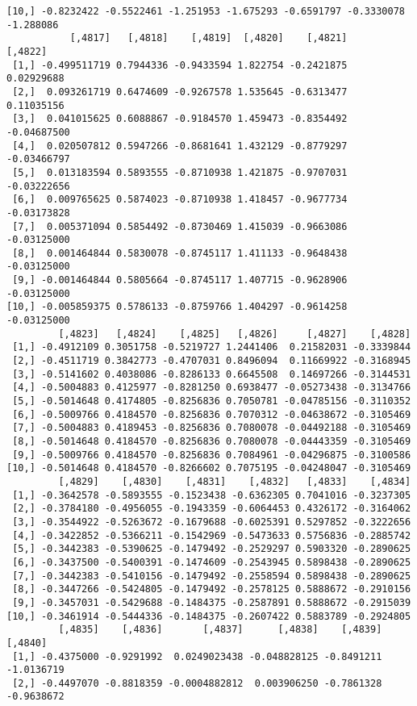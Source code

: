 \documentclass[
  letterpaper,
  DIV=11,
  numbers=noendperiod]{scrreprt}
\begin{document}
\begin{verbatim}
[10,] -0.8232422 -0.5522461 -1.251953 -1.675293 -0.6591797 -0.3330078 -1.288086
           [,4817]   [,4818]    [,4819]  [,4820]    [,4821]     [,4822]
 [1,] -0.499511719 0.7944336 -0.9433594 1.822754 -0.2421875  0.02929688
 [2,]  0.093261719 0.6474609 -0.9267578 1.535645 -0.6313477  0.11035156
 [3,]  0.041015625 0.6088867 -0.9184570 1.459473 -0.8354492 -0.04687500
 [4,]  0.020507812 0.5947266 -0.8681641 1.432129 -0.8779297 -0.03466797
 [5,]  0.013183594 0.5893555 -0.8710938 1.421875 -0.9707031 -0.03222656
 [6,]  0.009765625 0.5874023 -0.8710938 1.418457 -0.9677734 -0.03173828
 [7,]  0.005371094 0.5854492 -0.8730469 1.415039 -0.9663086 -0.03125000
 [8,]  0.001464844 0.5830078 -0.8745117 1.411133 -0.9648438 -0.03125000
 [9,] -0.001464844 0.5805664 -0.8745117 1.407715 -0.9628906 -0.03125000
[10,] -0.005859375 0.5786133 -0.8759766 1.404297 -0.9614258 -0.03125000
         [,4823]   [,4824]    [,4825]   [,4826]     [,4827]    [,4828]
 [1,] -0.4912109 0.3051758 -0.5219727 1.2441406  0.21582031 -0.3339844
 [2,] -0.4511719 0.3842773 -0.4707031 0.8496094  0.11669922 -0.3168945
 [3,] -0.5141602 0.4038086 -0.8286133 0.6645508  0.14697266 -0.3144531
 [4,] -0.5004883 0.4125977 -0.8281250 0.6938477 -0.05273438 -0.3134766
 [5,] -0.5014648 0.4174805 -0.8256836 0.7050781 -0.04785156 -0.3110352
 [6,] -0.5009766 0.4184570 -0.8256836 0.7070312 -0.04638672 -0.3105469
 [7,] -0.5004883 0.4189453 -0.8256836 0.7080078 -0.04492188 -0.3105469
 [8,] -0.5014648 0.4184570 -0.8256836 0.7080078 -0.04443359 -0.3105469
 [9,] -0.5009766 0.4184570 -0.8256836 0.7084961 -0.04296875 -0.3100586
[10,] -0.5014648 0.4184570 -0.8266602 0.7075195 -0.04248047 -0.3105469
         [,4829]    [,4830]    [,4831]    [,4832]   [,4833]    [,4834]
 [1,] -0.3642578 -0.5893555 -0.1523438 -0.6362305 0.7041016 -0.3237305
 [2,] -0.3784180 -0.4956055 -0.1943359 -0.6064453 0.4326172 -0.3164062
 [3,] -0.3544922 -0.5263672 -0.1679688 -0.6025391 0.5297852 -0.3222656
 [4,] -0.3422852 -0.5366211 -0.1542969 -0.5473633 0.5756836 -0.2885742
 [5,] -0.3442383 -0.5390625 -0.1479492 -0.2529297 0.5903320 -0.2890625
 [6,] -0.3437500 -0.5400391 -0.1474609 -0.2543945 0.5898438 -0.2890625
 [7,] -0.3442383 -0.5410156 -0.1479492 -0.2558594 0.5898438 -0.2890625
 [8,] -0.3447266 -0.5424805 -0.1479492 -0.2578125 0.5888672 -0.2910156
 [9,] -0.3457031 -0.5429688 -0.1484375 -0.2587891 0.5888672 -0.2915039
[10,] -0.3461914 -0.5444336 -0.1484375 -0.2607422 0.5883789 -0.2924805
         [,4835]    [,4836]       [,4837]      [,4838]    [,4839]    [,4840]
 [1,] -0.4375000 -0.9291992  0.0249023438 -0.048828125 -0.8491211 -1.0136719
 [2,] -0.4497070 -0.8818359 -0.0004882812  0.003906250 -0.7861328 -0.9638672

\end{verbatim}
\end{document}

